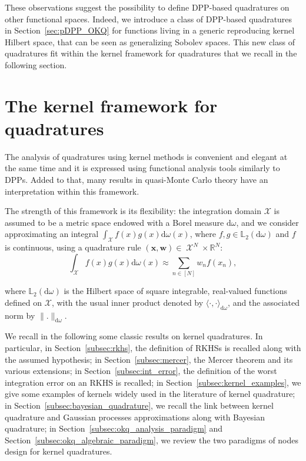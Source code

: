 \documentclass[twoside,11pt]{book}
\numberwithin{theorem}{chapter}
\numberwithin{definition}{chapter}
\numberwithin{proposition}{chapter}
\numberwithin{corollary}{chapter}
\numberwithin{example}{chapter}
\numberwithin{lemma}{chapter}
\DeclareMathOperator{\X}{\mathcal{X}}
\begin{document}
These observations suggest the possibility to define DPP-based quadratures on other functional spaces. Indeed, we introduce a class of DPP-based quadratures in Section~\ref{sec:pDPP_OKQ} for functions living in a generic reproducing kernel Hilbert space, that can be seen as generalizing  Sobolev spaces.
This new class of quadratures fit within the kernel framework for quadratures that we recall in the following section.

\section{The kernel framework for quadratures}


The analysis of quadratures using kernel methods is convenient and elegant at the same time and it is expressed using functional analysis tools similarly to DPPs. Added to that, many results in quasi-Monte Carlo theory have an interpretation within this framework. 

The strength of this framework is its flexibility: the integration domain $\mathcal{X}$ is assumed to be a metric space endowed with a Borel measure $\mathrm{d}\omega$, and we consider approximating an integral $\displaystyle \int_{\X} f(x)g(x)\mathrm{d}\omega(x)$, where $f,g \in \mathbb{L}_{2}(\mathrm{d}\omega)$ and $f$  is continuous, using a quadrature rule $(\bm{x}, \bm{w}) \in \X^{N} \times \mathbb{R}^{N}$:
\begin{equation}\label{eq:int_error}
\int_{\X} f(x)g(x)\mathrm{d}\omega(x) \approx \sum\limits_{n \in [N]} w_{n} f(x_{n}),
\end{equation}

where $\mathbb{L}_{2}(\mathrm{d}\omega)$ is the Hilbert space of square integrable, real-valued functions defined on $\mathcal{X}$, with the usual inner product denoted by $\langle \cdot, \cdot \rangle_{\mathrm{d}\omega}$, and the associated norm by $\|.\|_{\mathrm{d}\omega}$.


We recall in the following some classic results on kernel quadratures. In particular, in Section~\ref{subsec:rkhs},  the definition of RKHSs is recalled along with the assumed hypothesis; in Section~\ref{subsec:mercer}, the Mercer theorem and its various extensions; in Section~\ref{subsec:int_error}, the definition of the worst integration error on an RKHS is recalled; in Section~\ref{subsec:kernel_examples}, we give some examples of kernels widely used in the literature of kernel quadrature; in Section~\ref{subsec:bayesian_quadrature}, we recall the link between kernel quadrature and Gaussian processes approximations along with Bayesian quadrature; in Section~\ref{subsec:okq_analysis_paradigm} and Section~\ref{subsec:okq_algebraic_paradigm}, we review the two paradigms of nodes design for kernel quadratures.
\end{document}
